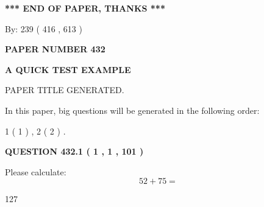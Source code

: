 \documentclass[12pt]{article}
\begin{document}
   
   
   
\vspace{1.0in} 
{\textbf{\large{ *** END OF PAPER, THANKS *** }}} 
   
   
\hspace{1.0in} By: 
 239 ( 416 ,  613 )
   
   
   
   
\newpage 
\setcounter{page}{ 
   432001 } 
   
   
   
   
 {\textbf{ \Large{ PAPER NUMBER  432  }}}
   
   
\vspace{0.2in}
   
   
   
   
   
   
   
   
 \vspace{0.2in}
{\LARGE {\textbf{ A QUICK TEST EXAMPLE}}}
   
   
 PAPER TITLE GENERATED.
   
   
   
\vspace{0.2in}
   
In this paper, big questions will be generated in the following order: 
   
   
   1 ( 1 )
 ,
   2 ( 2 )
 .
  
\vspace{0.2in}
  
{\textbf{\Large{QUESTION
432.1 
 ( 1 , 1 , 101 )
}}}
  
  
 
Please calculate:
\begin{equation}
52 +  %
75 = \nonumber
\end{equation}
 
 
 
\noindent{}
 
 

127
 
 
\noindent{}
 
 

 
 
 
\noindent{}
 
\end{document}
